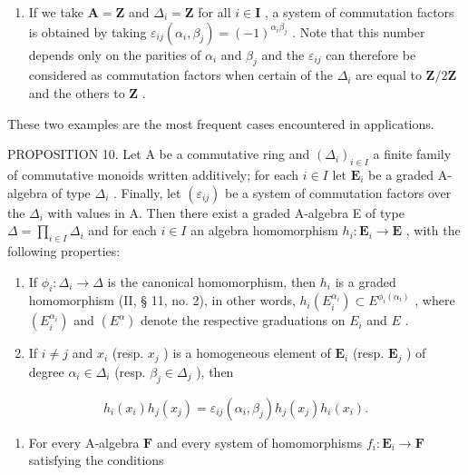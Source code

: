 \begin{enumerate}
\def\labelenumi{(\arabic{enumi})}
\setcounter{enumi}{1}
\tightlist
\item
  If we take \(\mathbf{A} = \mathbf{Z}\) and \(\Delta_{i} = \mathbf{Z}\) for all \(i \in \mathbf{I}\) , a system of commutation factors is obtained by taking \(\varepsilon_{ij}(\alpha_i, \beta_j) = (-1)^{\alpha_i\beta_j}\) . Note that this number depends only on the parities of \(\alpha_{i}\) and \(\beta_{j}\) and the \(\varepsilon_{ij}\) can therefore be considered as commutation factors when certain of the \(\Delta_{i}\) are equal to \(\mathbf{Z}/2\mathbf{Z}\) and the others to \(\mathbf{Z}\) .
\end{enumerate}

These two examples are the most frequent cases encountered in applications.

PROPOSITION 10. Let A be a commutative ring and \((\Delta_{i})_{i\in I}\) a finite family of commutative monoids written additively; for each \(i\in I\) let \(\mathbf{E}_i\) be a graded A-algebra of type \(\Delta_i\) . Finally, let \((\varepsilon_{ij})\) be a system of commutation factors over the \(\Delta_i\) with values in A. Then there exist a graded A-algebra E of type \(\Delta = \prod_{i\in I}\Delta_i\) and for each \(i\in I\) an algebra homomorphism \(h_i:\mathbf{E}_i\to \mathbf{E}\) , with the following properties:

\begin{enumerate}
\def\labelenumi{(\roman{enumi})}
\item
  If \(\phi_{i}:\Delta_{i}\to\Delta\) is the canonical homomorphism, then \(h_{i}\) is a graded homomorphism (II, § 11, no. 2), in other words, \(h_{i}(E_{i}^{\alpha_{i}})\subset E^{\phi_{i}(\alpha_{i})}\) , where \((E_{i}^{\alpha_{i}})\) and \((E^{\alpha})\) denote the respective graduations on \(E_{i}\) and \(E\) .
\item
  If \(i \neq j\) and \(x_{i}\) (resp. \(x_{j}\) ) is a homogeneous element of \(\mathbf{E}_i\) (resp. \(\mathbf{E}_j\) ) of degree \(\alpha_i \in \Delta_i\) (resp. \(\beta_j \in \Delta_j\) ), then
\end{enumerate}

\[
h _ {i} (x _ {i}) h _ {j} (x _ {j}) = \varepsilon_ {i j} (\alpha_ {i}, \beta_ {j}) h _ {j} (x _ {j}) h _ {i} (x _ {i}).\tag{25}
\]

\begin{enumerate}
\def\labelenumi{(\roman{enumi})}
\setcounter{enumi}{2}
\tightlist
\item
  For every A-algebra \(\mathbf{F}\) and every system of homomorphisms \(f_{i}:\mathbf{E}_{i}\to \mathbf{F}\) satisfying the conditions
\end{enumerate}

